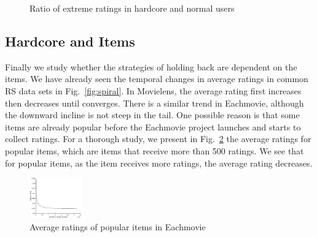 \documentclass[sigconf]{acmart}
\begin{document}
\begin{figure}[htbp]
\centering
\centering
{}
\caption{Ratio of extreme ratings in hardcore and normal users}
\label{fig:hardcore}
\end{figure}

\subsection{Hardcore and Items}
Finally we study whether the strategies of holding back are dependent on the items. We have already seen the temporal changes in average ratings in common RS data sets in Fig.~\ref{fig:spiral}. In Movielens, the average rating first increases then decreases until converges. There is a similar trend in Eachmovie, although the downward incline is not steep in the tail. One possible reason is that some items are already popular before the Eachmovie project launches and starts to collect ratings. For a thorough study, we present in Fig.~\ref{fig:ratingpopulareachmovie} the average ratings for popular items, which are items that receive more than 500 ratings. We see that for popular items, as the item receives more ratings, the average rating decreases.

\begin{figure}[htbp]
\centering
\begin{center}
\includegraphics[width=0.2\textwidth]{fig8_eachmovie_popular.eps}
\caption{{Average ratings of popular items in Eachmovie}}
\label{fig:ratingpopulareachmovie}
\end{center}
\end{figure}
\end{document}
